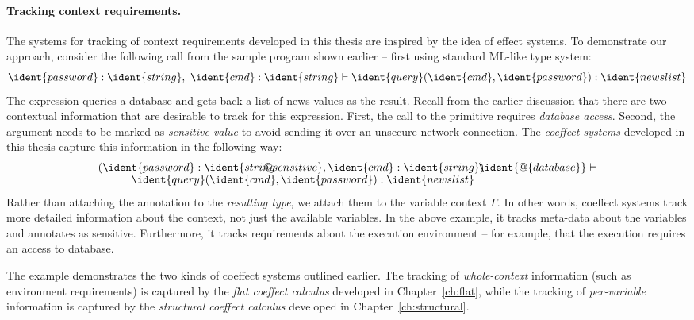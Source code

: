 \paragraph{Tracking context requirements.}

The systems for tracking of context requirements developed in this thesis are inspired by the idea
of effect systems. To demonstrate our approach, consider the following call from the sample program
shown earlier -- first using standard ML-like type system:
%
\begin{equation*}
\ident{password}\-:\-\ident{string},~\ident{cmd}\-:\-\ident{string} 
  \vdash \ident{query}(\ident{cmd}, \ident{password}) : \ident{news list}
\end{equation*}
%
The expression queries a database and gets back a list of news values as the result. Recall from the
earlier discussion that there are two contextual information that are desirable to track for this 
expression. First, the call to the  primitive requires \emph{database access}. Second,
the  argument needs to be marked as \emph{sensitive value} to avoid sending it over
an unsecure network connection.
The \emph{coeffect systems} developed in this thesis capture this information in the following way: 
%
\begin{equation*}
\begin{array}{l}
 ( \ident{password}\-:\-\ident{string \hspace{-1em}{\footnotesize @ sensitive}},
   \ident{cmd}\-:\-\ident{string})
 \hspace{-0.5em}
 \ident{\footnotesize @ \{ database \}} \vdash \\[-0.1em]
 \hspace{3em} \ident{query}(\ident{cmd}, \ident{password}) : \ident{news list}
\end{array}
\end{equation*}
%
Rather than attaching the annotation to the \emph{resulting type}, we attach them to the variable
context $\Gamma$. In other words, coeffect systems track more detailed information about the context,
not just the available variables. In the above example, it tracks meta-data about the variables
and annotates  as sensitive. Furthermore, it tracks requirements about the execution
environment -- for example, that the execution requires an access to database.

The example demonstrates the two kinds of coeffect systems outlined earlier. The tracking of 
\emph{whole-context} information (such as environment requirements) is captured by the \emph{flat 
coeffect calculus} developed in Chapter~\ref{ch:flat}, while the tracking of \emph{per-variable} 
information is captured by the \emph{structural coeffect calculus} developed in Chapter~\ref{ch:structural}.

